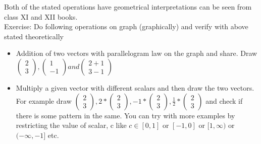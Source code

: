 \documentclass{article}
\begin{document}
Both of the stated operations have geometrical interpretations can be seen from class XI and XII books.\\
Exercise: Do following operations on graph (graphically) and verify with above stated theoretically
\begin{itemize}
    \item Addition of two vectors with parallelogram law on the graph and share. Draw $\begin{pmatrix}
        2\\3
    \end{pmatrix},
    \begin{pmatrix}
        1\\-1
    \end{pmatrix}
     and \begin{pmatrix}
        2+1\\3-1
    \end{pmatrix}$
    \item Multiply a given vector with different scalars and then draw the two vectors. For example draw $\begin{pmatrix}
        2\\3
    \end{pmatrix},2*\begin{pmatrix}
        2\\3
    \end{pmatrix},
    -1*\begin{pmatrix}
        2\\3
    \end{pmatrix},
    \frac{1}{2}*\begin{pmatrix}
        2\\3
    \end{pmatrix}$ and check if there is some pattern in the same. You can try with more examples by restricting the value of scalar, c like $c\in [0,1]$ or $[-1,0]$ or $[1,\infty)$ or $(-\infty,-1]$ etc.
\end{itemize}
\end{document}
